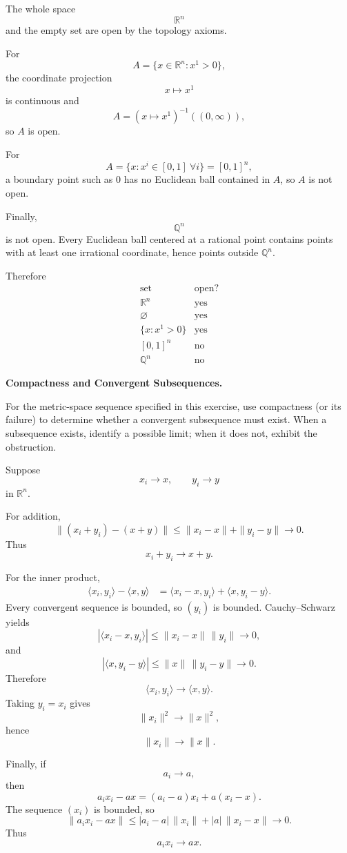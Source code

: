 \begin{solution}
The whole space
\[
\mathbb R^n
\]
and the empty set are open by the topology axioms.

For
\[
A=\{x\in\mathbb R^n:x^1>0\},
\]
the coordinate projection
\[
x\mapsto x^1
\]
is continuous and
\[
A=(x\mapsto x^1)^{-1}((0,\infty)),
\]
so \(A\) is open.

For
\[
A=\{x:x^i\in[0,1]\ \forall i\}=[0,1]^n,
\]
a boundary point such as \(0\) has no Euclidean ball contained in \(A\), so \(A\) is not
open.

Finally,
\[
\mathbb Q^n
\]
is not open. Every Euclidean ball centered at a rational point contains points with at least
one irrational coordinate, hence points outside \(\mathbb Q^n\).

Therefore
\[
\boxed{
\begin{array}{c|c}
\text{set}&\text{open?}\\ \hline
\mathbb R^n&\text{yes}\\
\varnothing&\text{yes}\\
\{x:x^1>0\}&\text{yes}\\
{}[0,1]^n&\text{no}\\
\mathbb Q^n&\text{no}
\end{array}
}
\]
\end{solution}


\begin{problem}[CP-II-0308]
\label{prob:cp-ii-0308}
\textbf{Compactness and Convergent Subsequences.}

\hspace*{1.5em}For the metric-space sequence specified in this exercise, use compactness (or
its failure) to determine whether a convergent subsequence must exist.
When a subsequence exists, identify a possible limit; when it does not,
exhibit the obstruction.
\end{problem}

\begin{solution}
Suppose
\[
x_i\to x,
\qquad
y_i\to y
\]
in \(\mathbb R^n\).

For addition,
\[
\|(x_i+y_i)-(x+y)\|
\le
\|x_i-x\|+\|y_i-y\|
\to0.
\]
Thus
\[
\boxed{x_i+y_i\to x+y.}
\]

For the inner product,
\[
\begin{aligned}
\langle x_i,y_i\rangle-\langle x,y\rangle
&=
\langle x_i-x,y_i\rangle
+
\langle x,y_i-y\rangle.
\end{aligned}
\]
Every convergent sequence is bounded, so \((y_i)\) is bounded. Cauchy--Schwarz yields
\[
|\langle x_i-x,y_i\rangle|
\le
\|x_i-x\|\,\|y_i\|
\to0,
\]
and
\[
|\langle x,y_i-y\rangle|
\le
\|x\|\,\|y_i-y\|
\to0.
\]
Therefore
\[
\boxed{
\langle x_i,y_i\rangle\to\langle x,y\rangle.
}
\]
Taking \(y_i=x_i\) gives
\[
\|x_i\|^2\to\|x\|^2,
\]
hence
\[
\boxed{\|x_i\|\to\|x\|.}
\]

Finally, if
\[
a_i\to a,
\]
then
\[
a_ix_i-ax
=
(a_i-a)x_i+a(x_i-x).
\]
The sequence \((x_i)\) is bounded, so
\[
\|a_ix_i-ax\|
\le
|a_i-a|\,\|x_i\|
+
|a|\,\|x_i-x\|
\to0.
\]
Thus
\[
\boxed{a_ix_i\to ax.}
\]
\end{solution}


